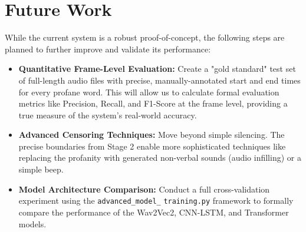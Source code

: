\documentclass{article}
\begin{document}
\section{Future Work}

While the current system is a robust proof-of-concept, the following steps are planned to further improve and validate its performance:

\begin{itemize}
    \item \textbf{Quantitative Frame-Level Evaluation:} Create a "gold standard" test set of full-length audio files with precise, manually-annotated start and end times for every profane word. This will allow us to calculate formal evaluation metrics like Precision, Recall, and F1-Score at the frame level, providing a true measure of the system's real-world accuracy.
    
    \item \textbf{Advanced Censoring Techniques:} Move beyond simple silencing. The precise boundaries from Stage 2 enable more sophisticated techniques like replacing the profanity with generated non-verbal sounds (audio infilling) or a simple beep.
    
    \item \textbf{Model Architecture Comparison:} Conduct a full cross-validation experiment using the \texttt{advanced\_model\_} \texttt{training.py} framework to formally compare the performance of the Wav2Vec2, CNN-LSTM, and Transformer models.

\end{itemize}
\end{document}
